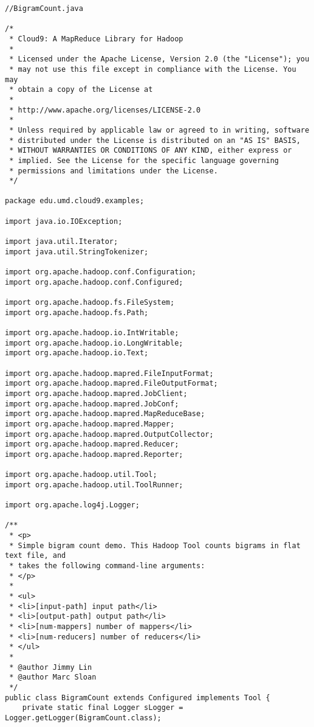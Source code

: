 \documentclass{article} %
\begin{document}
\begin{lstlisting}[style=Java]
//BigramCount.java

/*
 * Cloud9: A MapReduce Library for Hadoop
 * 
 * Licensed under the Apache License, Version 2.0 (the "License"); you
 * may not use this file except in compliance with the License. You may
 * obtain a copy of the License at
 *
 * http://www.apache.org/licenses/LICENSE-2.0 
 *
 * Unless required by applicable law or agreed to in writing, software
 * distributed under the License is distributed on an "AS IS" BASIS,
 * WITHOUT WARRANTIES OR CONDITIONS OF ANY KIND, either express or
 * implied. See the License for the specific language governing
 * permissions and limitations under the License.
 */

package edu.umd.cloud9.examples;

import java.io.IOException;

import java.util.Iterator;
import java.util.StringTokenizer;

import org.apache.hadoop.conf.Configuration;
import org.apache.hadoop.conf.Configured;

import org.apache.hadoop.fs.FileSystem;
import org.apache.hadoop.fs.Path;

import org.apache.hadoop.io.IntWritable;
import org.apache.hadoop.io.LongWritable;
import org.apache.hadoop.io.Text;

import org.apache.hadoop.mapred.FileInputFormat;
import org.apache.hadoop.mapred.FileOutputFormat;
import org.apache.hadoop.mapred.JobClient;
import org.apache.hadoop.mapred.JobConf;
import org.apache.hadoop.mapred.MapReduceBase;
import org.apache.hadoop.mapred.Mapper;
import org.apache.hadoop.mapred.OutputCollector;
import org.apache.hadoop.mapred.Reducer;
import org.apache.hadoop.mapred.Reporter;

import org.apache.hadoop.util.Tool;
import org.apache.hadoop.util.ToolRunner;

import org.apache.log4j.Logger;

/**
 * <p>
 * Simple bigram count demo. This Hadoop Tool counts bigrams in flat text file, and
 * takes the following command-line arguments:
 * </p>
 * 
 * <ul>
 * <li>[input-path] input path</li>
 * <li>[output-path] output path</li>
 * <li>[num-mappers] number of mappers</li>
 * <li>[num-reducers] number of reducers</li>
 * </ul>
 * 
 * @author Jimmy Lin
 * @author Marc Sloan
 */
public class BigramCount extends Configured implements Tool {
	private static final Logger sLogger = Logger.getLogger(BigramCount.class);


\end{lstlisting}
\end{document}
